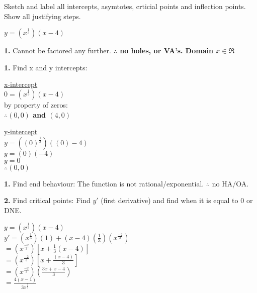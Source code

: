 \documentclass[12pt,fleqn]{book} %
\begin{document}
\noindent Sketch and label all intercepts, asymtotes, crticial points and inflection points. Show all justifying steps.

\vspace*{3mm}

{\large $y=(x^\frac{1}{3})(x-4)$}

\vspace*{3mm}

\noindent \textbf{1.} Cannot be factored any further. \textbf{$\therefore$ no holes, or VA's. Domain $x \in \Re$} \\

\vspace*{-4mm}

\noindent \textbf{1.} Find x and y intercepts:

\vspace*{-2mm}

\begin{multicols}{2}
    \begin{center}
        \underline{x-intercept} \\
        $0=(x^\frac{1}{3})(x-4)$\\
        by property of zeros: \\
        \textbf{$\therefore (0, 0)$ and $(4, 0)$}

        \columnbreak

        \underline{y-intercept} \\
        $y=((0)^\frac{1}{3})((0)-4)$ \\
        $y=(0)(-4)$ \\
        $y=0$ \\
        \textbf{$\therefore (0, 0)$}
        \columnbreak
    \end{center}
\end{multicols}

\noindent \textbf{1.} Find end behaviour: The function is not rational/exponential. $\therefore$ no HA/OA.

\vspace*{2mm}

\noindent \textbf{2.} Find critical points: Find $y'$ (first derivative) and find when it is equal to 0 or DNE.

\vspace*{-2mm}

\begin{center}
    $y = (x^\frac{1}{3})(x-4)$ \\
    \vspace*{2mm}
    $y' = (x^\frac{1}{3})(1) + (x-4)(\frac{1}{3})(x^\frac{-2}{3})$ \\
    \vspace*{1mm}
    $= (x^\frac{-2}{3})[x+\frac{1}{3}(x-4)]$ \\
    \vspace*{1mm}
    $= (x^\frac{-2}{3})[x+\frac{(x-4)}{3}]$ \\
    \vspace*{1mm}
    $= (x^\frac{-2}{3})(\frac{3x+x-4}{3})$ \\
    \vspace*{1mm}
    {\large $= \frac{4(x-1)}{3x^\frac{2}{3}}$}
    \vspace*{1mm}
\end{center}
\end{document}
